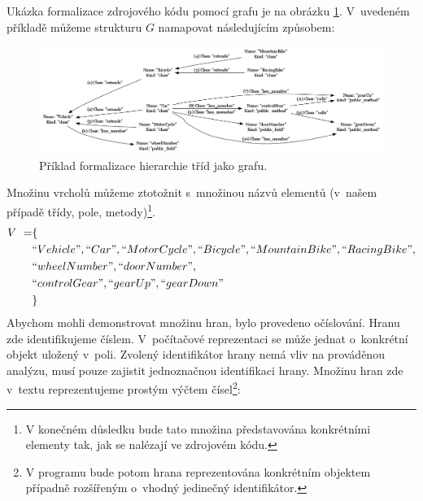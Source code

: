 Ukázka formalizace zdrojového kódu pomocí grafu je na obrázku \ref{design-graph_example}. V~uvedeném příkladě můžeme strukturu $G$ namapovat následujícím způsobem:
\begin{figure}[h!]
  \centering
  \includegraphics[width=1.0\textwidth]{./graphs/graph_example.png}
  \caption{Příklad formalizace hierarchie tříd jako grafu.\label{design-graph_example}}
\end{figure}
Množinu vrcholů můžeme ztotožnit s~množinou názvů elementů (v~našem případě třídy, pole, metody)\footnote{V konečném důsledku bude tato množina představována konkrétními elementy tak, jak se nalézají ve zdrojovém kódu.}.
\begin{align*}
  V~= &\{ \\
  &``Vehicle", ``Car", ``MotorCycle", ``Bicycle", ``MountainBike", ``RacingBike", \\
  &``wheelNumber", ``doorNumber", \\
  &``controlGear", ``gearUp", ``gearDown" \\
  &\}
\end{align*}
Abychom mohli demonstrovat množinu hran, bylo provedeno očíslování. Hranu zde identifikujeme číslem. V~počítačové reprezentaci se může jednat o~konkrétní objekt uložený v~poli. Zvolený identifikátor hrany nemá vliv na prováděnou analýzu, musí pouze zajistit jednoznačnou identifikaci hrany. Množinu hran zde v~textu reprezentujeme prostým výčtem čísel\footnote{V programu bude potom hrana reprezentována konkrétním objektem případně rozšířeným o~vhodný jedinečný identifikátor.}:

